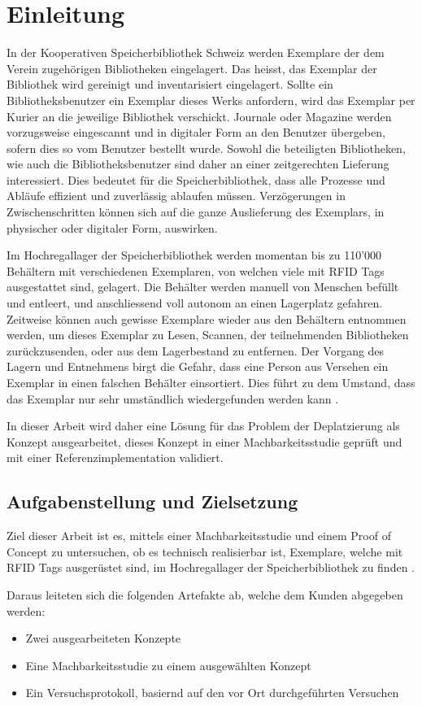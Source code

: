 \chapter{Einleitung}
In der Kooperativen Speicherbibliothek Schweiz werden Exemplare der dem Verein zugehörigen Bibliotheken eingelagert. Das heisst, das Exemplar der Bibliothek wird gereinigt und inventarisiert eingelagert. Sollte ein Bibliotheksbenutzer ein Exemplar dieses Werks anfordern, wird das Exemplar per Kurier an die jeweilige Bibliothek verschickt. Journale oder Magazine werden vorzugsweise eingescannt und in digitaler Form an den Benutzer übergeben, sofern dies so vom Benutzer bestellt wurde. Sowohl die beteiligten Bibliotheken, wie auch die Bibliotheksbenutzer sind daher an einer zeitgerechten Lieferung interessiert. Dies bedeutet für die Speicherbibliothek, dass alle Prozesse und Abläufe effizient und zuverlässig ablaufen müssen. Verzögerungen in Zwischenschritten können sich auf die ganze Auslieferung des Exemplars, in physischer oder digitaler Form, auswirken.

Im Hochregallager der Speicherbibliothek werden momentan bis zu 110'000 Behältern mit verschiedenen Exemplaren, von welchen viele mit RFID Tags ausgestattet sind, gelagert. Die Behälter werden manuell von Menschen befüllt und entleert, und anschliessend voll autonom an einen Lagerplatz gefahren. Zeitweise können auch gewisse Exemplare wieder aus den Behältern entnommen werden, um dieses Exemplar zu Lesen, Scannen, der teilnehmenden Bibliotheken zurückzusenden, oder aus dem Lagerbestand zu entfernen. Der Vorgang des Lagern und Entnehmens birgt die Gefahr, dass eine Person aus Versehen ein Exemplar in einen falschen Behälter einsortiert. Dies führt zu dem Umstand, dass das Exemplar nur sehr umständlich wiedergefunden werden kann \parencite{WickiBaumann2019Projektbeschrieb}.

In dieser Arbeit wird daher eine Lösung für das Problem der Deplatzierung als Konzept ausgearbeitet, dieses Konzept in einer Machbarkeitsstudie geprüft und mit einer Referenzimplementation validiert.

\section{Aufgabenstellung und Zielsetzung}
Ziel dieser Arbeit ist es, mittels einer Machbarkeitsstudie und einem Proof of Concept zu untersuchen, ob es technisch realisierbar ist, Exemplare, welche mit RFID Tags ausgerüstet sind, im Hochregallager der Speicherbibliothek zu finden \parencite{WickiBaumann2019Projektbeschrieb}.

Daraus leiteten sich die folgenden Artefakte ab, welche dem Kunden abgegeben werden:
\begin{itemize}
	\item Zwei ausgearbeiteten Konzepte
	\item Eine Machbarkeitsstudie zu einem ausgewählten Konzept
	\item Ein Versuchsprotokoll, basiernd auf den vor Ort durchgeführten Versuchen
\end{itemize}
